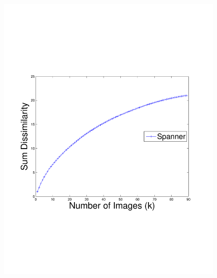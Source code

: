 \begin{figure}
{        \includegraphics[clip=true, trim = 17mm 65mm 25mm 70mm, scale=0.23]{figures/spanner/spannerCumulativeDist_color.pdf}
        \label{fig:spanSumDissim}
        }
\end{figure}
